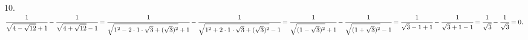 10. $\cfrac{1}{\sqrt{4-\sqrt{12}}+1}-\cfrac{1}{\sqrt{4+\sqrt{12}}-1}=\cfrac{1}{\sqrt{1^2-2\cdot1\cdot\sqrt{3}+(\sqrt{3})^2}+1}-\cfrac{1}{\sqrt{1^2+2\cdot1\cdot\sqrt{3}+(\sqrt{3})^2}-1}=
\cfrac{1}{\sqrt{(1-\sqrt{3})^2}+1}-\cfrac{1}{\sqrt{(1+\sqrt{3})^2}-1}=\cfrac{1}{\sqrt{3}-1+1}-\cfrac{1}{\sqrt{3}+1-1}=
\cfrac{1}{\sqrt{3}}-\cfrac{1}{\sqrt{3}}=0.$\\
